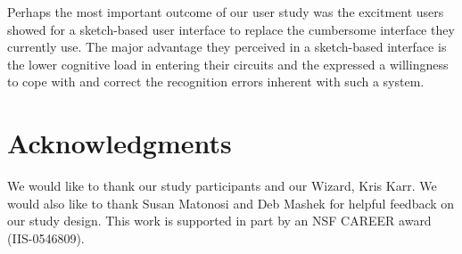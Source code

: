 \documentclass{egpubl}
\begin{document}
Perhaps the most important outcome of our user study was the excitment
users showed for a sketch-based user interface to replace the
cumbersome interface they currently use.  The major advantage they
perceived in a sketch-based interface is the lower cognitive load in
entering their circuits and the expressed a willingness to cope with
and correct the recognition errors inherent with such a system.



\section{Acknowledgments}
We would like to thank our study participants and our Wizard, Kris
Karr.  We would also like to thank Susan Matonosi and Deb Mashek for
helpful feedback on our study design.  This work is supported in part
by an NSF CAREER award (IIS-0546809).






%
%













\end{document}

